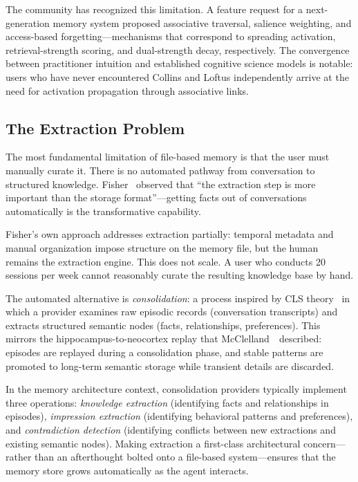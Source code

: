 The community has recognized this limitation.  A feature request for
a next-generation memory system proposed associative traversal,
salience weighting, and access-based forgetting---mechanisms that
correspond to spreading activation, retrieval-strength scoring, and
dual-strength decay, respectively.  The convergence between practitioner
intuition and established cognitive science models is notable: users
who have never encountered Collins and Loftus independently arrive at
the need for activation propagation through associative links.

\subsection{The Extraction Problem}
\label{sec:memorymd-extraction}

The most fundamental limitation of file-based memory is that the user
must manually curate it.  There is no automated pathway from
conversation to structured knowledge.  Fisher~\cite{fisher2026}
observed that ``the extraction step is more important than the storage
format''---getting facts out of conversations automatically is the
transformative capability.

Fisher's own approach addresses extraction partially: temporal metadata
and manual organization impose structure on the memory file, but the
human remains the extraction engine.  This does not scale.  A user who
conducts 20 sessions per week cannot reasonably curate the resulting
knowledge base by hand.

The automated alternative is \emph{consolidation}: a process inspired
by CLS theory~\cite{mcclelland1995} in which a provider examines raw
episodic records (conversation transcripts) and extracts structured
semantic nodes (facts, relationships, preferences).  This mirrors the
hippocampus-to-neocortex replay that McClelland~\etal\ described:
episodes are replayed during a consolidation phase, and stable patterns
are promoted to long-term semantic storage while transient details are
discarded.

In the memory architecture context, consolidation providers typically
implement three operations: \emph{knowledge extraction} (identifying
facts and relationships in episodes), \emph{impression extraction}
(identifying behavioral patterns and preferences), and
\emph{contradiction detection} (identifying conflicts between new
extractions and existing semantic nodes).  Making extraction a
first-class architectural concern---rather than an afterthought bolted
onto a file-based system---ensures that the memory store grows
automatically as the agent interacts.

